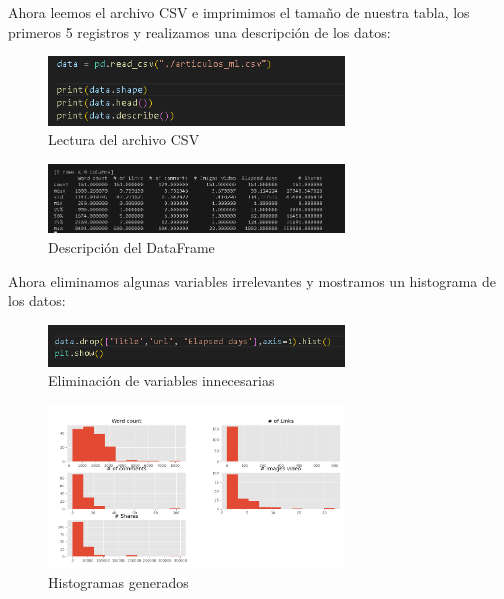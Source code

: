 \documentclass{article}
\begin{document}
Ahora leemos el archivo CSV e imprimimos el tama\~no de nuestra tabla, los primeros 5 registros y realizamos una descripci\'on de los datos:

\begin{figure}[H]
    \centering
    \includegraphics[width=0.7\textwidth]{img/2.png}
    \caption{Lectura del archivo CSV}
\end{figure}

\begin{figure}[H]
    \centering
    \includegraphics[width=0.7\textwidth]{img/3.png}
    \caption{Descripci\'on del DataFrame}
\end{figure}

Ahora eliminamos algunas variables irrelevantes y mostramos un histograma de los datos:

\begin{figure}[H]
    \centering
    \includegraphics[width=0.7\textwidth]{img/4.png}
    \caption{Eliminaci\'on de variables innecesarias}
\end{figure}

\begin{figure}[H]
    \centering
    \includegraphics[width=0.7\textwidth]{img/5.png}
    \caption{Histogramas generados}
\end{figure}
\end{document}
